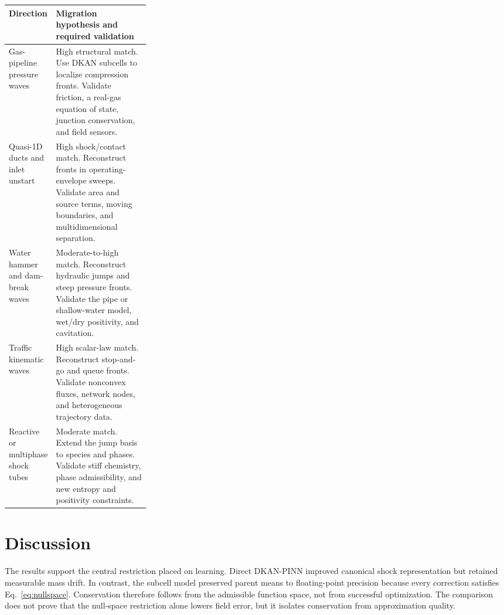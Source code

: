 \documentclass[10pt,twocolumn]{article}
\renewcommand{\arraystretch}{1.12}
\begin{document}
\begin{minipage}[t]{0.53\textwidth}
\vspace{9pt}
\captionsetup{hypcap=false}
\label{tab:applications}
\scriptsize
\renewcommand{\arraystretch}{1.0}
\begin{tabularx}{\linewidth}{P{0.28\linewidth}Y}
\toprule
Direction & Migration hypothesis and required validation\\
\midrule
Gas-pipeline pressure waves & High structural match. Use DKAN subcells to localize compression fronts. Validate friction, a real-gas equation of state, junction conservation, and field sensors.\\
Quasi-1D ducts and inlet unstart & High shock/contact match. Reconstruct fronts in operating-envelope sweeps. Validate area and source terms, moving boundaries, and multidimensional separation.\\
Water hammer and dam-break waves & Moderate-to-high match. Reconstruct hydraulic jumps and steep pressure fronts. Validate the pipe or shallow-water model, wet/dry positivity, and cavitation.\\
Traffic kinematic waves & High scalar-law match. Reconstruct stop-and-go and queue fronts. Validate nonconvex fluxes, network nodes, and heterogeneous trajectory data.\\
Reactive or multiphase shock tubes & Moderate match. Extend the jump basis to species and phases. Validate stiff chemistry, phase admissibility, and new entropy and positivity constraints.\\
\bottomrule
\end{tabularx}
\end{minipage}
\twocolumn

\section{Discussion}

The results support the central restriction placed on learning. Direct DKAN-PINN improved canonical shock representation but retained measurable mass drift. In contrast, the subcell model preserved parent means to floating-point precision because every correction satisfies Eq.~\eqref{eq:nullspace}. Conservation therefore follows from the admissible function space, not from successful optimization. The comparison does not prove that the null-space restriction alone lowers field error, but it isolates conservation from approximation quality.
\end{document}
